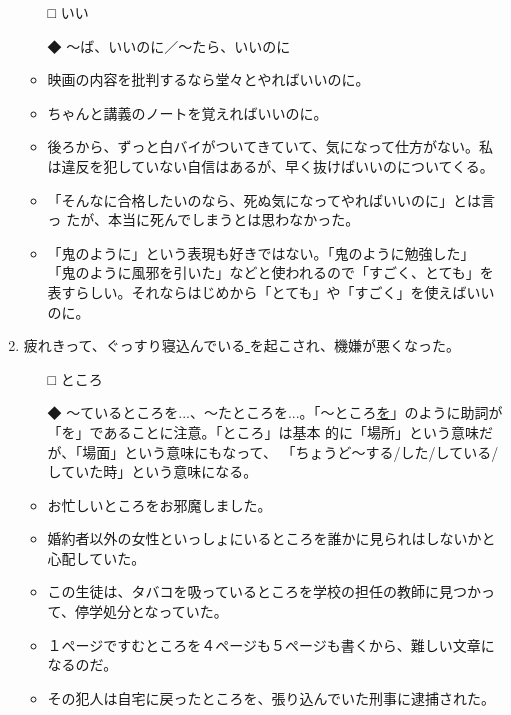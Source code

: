 \documentclass[
uplatex,
b5paper,
10pt,
dvipdfmx
]{jsbook}
\begin{document}
\begin{enumerate}
 \begin{itemize}
  \item[□]  いい
  \item[◆]  〜ば、いいのに／〜たら、いいのに
 \end{itemize}

\begin{itemize}
 \item 映画の内容を批判するなら堂々とやればいいのに。
 \item ちゃんと講義のノートを覚えればいいのに。
 \item 後ろから、ずっと白バイがついてきていて、気になって仕方がない。私
       は違反を犯していない自信はあるが、早く抜けばいいのについてくる。
 \item 「そんなに合格したいのなら、死ぬ気になってやればいいのに」とは言っ
       たが、本当に死んでしまうとは思わなかった。
 \item 「鬼のように」という表現も好きではない。「鬼のように勉強した」
       「鬼のように風邪を引いた」などと使われるので「すごく、とても」を
       表すらしい。それならはじめから「とても」や「すごく」を使えばいいのに。
\end{itemize}

 \item  疲れきって、ぐっすり寝込んでいる\underline{   }を起こされ、機嫌が悪くなった。

 \begin{itemize}
  \item[□] ところ
  \item[◆] 〜ているところを...、〜たところを...。「〜ところ\underline
	    {を}」のように助詞が「を」であることに注意。「ところ」は基本
	    的に「場所」という意味だが、「場面」という意味にもなって、
	    「ちょうど〜する/した/している/していた時」という意味になる。
 \end{itemize}

\begin{itemize}
 \item お忙しいところをお邪魔しました。
 \item 婚約者以外の女性といっしょにいるところを誰かに見られはしないかと
       心配していた。
 \item この生徒は、タバコを吸っているところを学校の担任の教師に見つかっ
       て、停学処分となっていた。
 \item １ページですむところを４ページも５ページも書くから、難しい文章に
       なるのだ。
 \item その犯人は自宅に戻ったところを、張り込んでいた刑事に逮捕された。
\end{itemize}


\end{enumerate}
\end{document}
